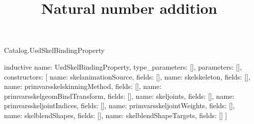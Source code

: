 \begin{lexlean}{Catalog.UsdSkelBindingProperty}
\title{Natural number addition}
\begin{semanticmodule}
inductive{
  name: UsdSkelBindingProperty,
  type_parameters: [],
  parameters: [],
  constructors: [
    {name: skelanimationSource, fields: []},
    {name: skelskeleton, fields: []},
    {name: primvarsskelskinningMethod, fields: []},
    {name: primvarsskelgeomBindTransform, fields: []},
    {name: skeljoints, fields: []},
    {name: primvarsskeljointIndices, fields: []},
    {name: primvarsskeljointWeights, fields: []},
    {name: skelblendShapes, fields: []},
    {name: skelblendShapeTargets, fields: []}
  ]
}
\end{semanticmodule}
\end{lexlean}
